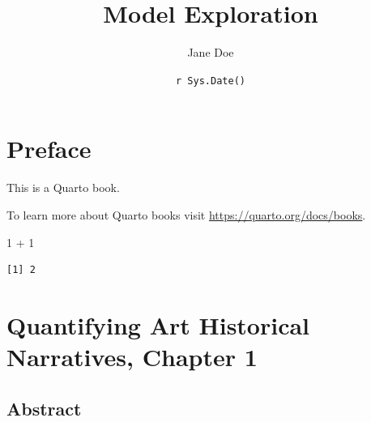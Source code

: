 \documentclass[
  letterpaper,
  DIV=11,
  numbers=noendperiod]{scrreprt}
\title{Model Exploration}
\author{Jane Doe}
\date{\texttt{r\ Sys.Date()}}
\newenvironment{Shaded}{\begin{snugshade}}{\end{snugshade}}
\newcommand{\DecValTok}[1]{\textcolor[rgb]{0.68,0.00,0.00}{#1}}
\newcommand{\SpecialCharTok}[1]{\textcolor[rgb]{0.37,0.37,0.37}{#1}}
\renewcommand*\contentsname{Table of contents}
\begin{document}
\maketitle

\renewcommand*\contentsname{Table of contents}
{
\hypersetup{linkcolor=}
\setcounter{tocdepth}{2}
\tableofcontents
}
\hypertarget{preface}{%
\chapter*{Preface}\label{preface}}

This is a Quarto book.

To learn more about Quarto books visit
\url{https://quarto.org/docs/books}.

\begin{Shaded}
\begin{Highlighting}[]
\DecValTok{1} \SpecialCharTok{+} \DecValTok{1}
\end{Highlighting}
\end{Shaded}

\begin{verbatim}
[1] 2
\end{verbatim}

\hypertarget{quantifying-art-historical-narratives-chapter-1}{%
\chapter{Quantifying Art Historical Narratives, Chapter
1}\label{quantifying-art-historical-narratives-chapter-1}}

\hypertarget{abstract}{%
\section{Abstract}\label{abstract}}
\end{document}
